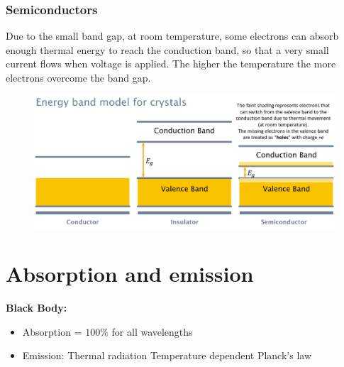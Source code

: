 \subsubsection{Semiconductors}
Due to the small band gap, at room temperature, some electrons can absorb enough thermal energy to reach the conduction band, so that a very small current flows when voltage is applied.
The higher the temperature the more electrons overcome the band gap.
\begin{figure}[h]
    \centering
    \includegraphics[width=\columnwidth]{images/bandmodel2.png}
    \label{fig:bandmodel2}
\end{figure}
\section{Absorption and emission}
\textbf{Black Body:}
\begin{itemize}
    \item Absorption = \(100\%\) for all wavelengths
    \item Emission:
    \subitem Thermal radiation
    \subitem Temperature dependent
    \subitem Planck's law 
\end{itemize}
